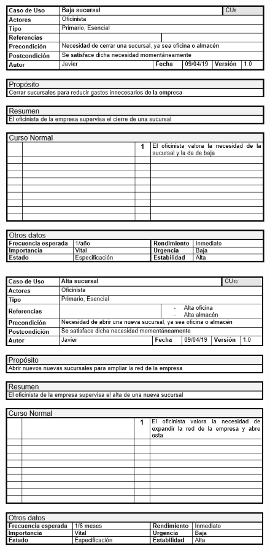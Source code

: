 \begin{figure}[H]
	\centering
	\includegraphics[width=16cm]{9j}
\end{figure}
\begin{figure}[H]
	\centering
	\includegraphics[width=16cm]{10j}
\end{figure}
